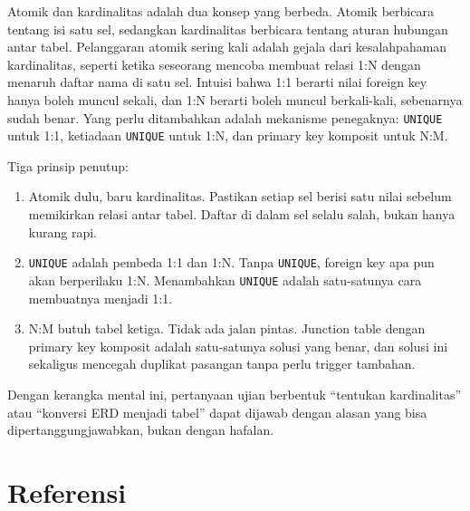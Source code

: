 \documentclass[11pt,a4paper]{article}
\begin{document}
Atomik dan kardinalitas adalah dua konsep yang berbeda. Atomik berbicara tentang isi satu sel, sedangkan kardinalitas berbicara tentang aturan hubungan antar tabel. Pelanggaran atomik sering kali adalah gejala dari kesalahpahaman kardinalitas, seperti ketika seseorang mencoba membuat relasi 1:N dengan menaruh daftar nama di satu sel. Intuisi bahwa 1:1 berarti nilai foreign key hanya boleh muncul sekali, dan 1:N berarti boleh muncul berkali-kali, sebenarnya sudah benar. Yang perlu ditambahkan adalah mekanisme penegaknya: \texttt{UNIQUE} untuk 1:1, ketiadaan \texttt{UNIQUE} untuk 1:N, dan primary key komposit untuk N:M.

Tiga prinsip penutup:

\begin{enumerate}
	\item Atomik dulu, baru kardinalitas. Pastikan setiap sel berisi satu nilai sebelum memikirkan relasi antar tabel. Daftar di dalam sel selalu salah, bukan hanya kurang rapi.
	\item \texttt{UNIQUE} adalah pembeda 1:1 dan 1:N. Tanpa \texttt{UNIQUE}, foreign key apa pun akan berperilaku 1:N. Menambahkan \texttt{UNIQUE} adalah satu-satunya cara membuatnya menjadi 1:1.
	\item N:M butuh tabel ketiga. Tidak ada jalan pintas. Junction table dengan primary key komposit adalah satu-satunya solusi yang benar, dan solusi ini sekaligus mencegah duplikat pasangan tanpa perlu trigger tambahan.
\end{enumerate}

Dengan kerangka mental ini, pertanyaan ujian berbentuk ``tentukan kardinalitas'' atau ``konversi ERD menjadi tabel'' dapat dijawab dengan alasan yang bisa dipertanggungjawabkan, bukan dengan hafalan.

\newpage
\section*{Referensi}
\end{document}
